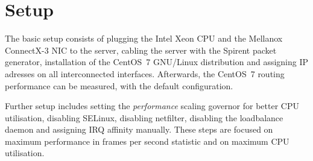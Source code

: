 
\chapter{Setup}\label{chap:setup}
The basic setup consists of plugging the Intel Xeon CPU and the Mellanox ConnectX-3 NIC to the server,
cabling the server with the Spirent packet generator,
installation of the CentOS~7 GNU/Linux distribution and assigning IP adresses on all interconnected interfaces.
Afterwards, the CentOS~7 routing performance can be measured, with the default configuration.

Further setup includes setting the {\it{performance}} scaling governor for better CPU utilisation,
disabling SELinux, disabling netfilter,
disabling the loadbalance daemon and assigning IRQ affinity manually.
These steps are focused on maximum performance in frames per second statistic
and on maximum CPU utilisation.








